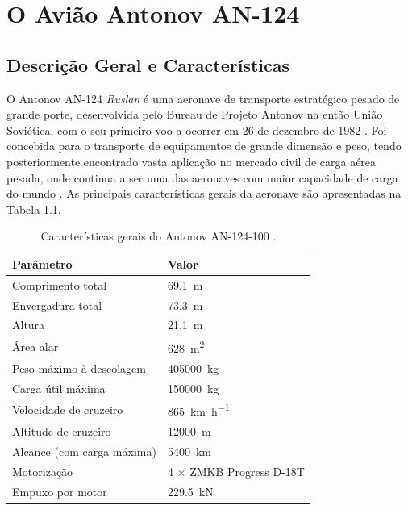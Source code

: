\documentclass[11pt,oneside,a4paper,final]{report}
\begin{document}
\chapter{O Avião Antonov AN-124}
\label{chap:an124}

\section{Descrição Geral e Características}

O Antonov AN-124 \textit{Ruslan} é uma aeronave de transporte estratégico pesado de grande porte, desenvolvida pelo Bureau de Projeto Antonov na então União Soviética, com o seu primeiro voo a ocorrer em 26 de dezembro de 1982 \cite{Gordon2008}. Foi concebida para o transporte de equipamentos de grande dimensão e peso, tendo posteriormente encontrado vasta aplicação no mercado civil de carga aérea pesada, onde continua a ser uma das aeronaves com maior capacidade de carga do mundo \cite{GarciaFernandez2025}. As principais características gerais da aeronave são apresentadas na Tabela \ref{tab:an124_specs}.

\begin{table}[H]
\centering
\caption{Características gerais do Antonov AN-124-100 
\cite{Gordon2008, GarciaFernandez2025}.}
\label{tab:an124_specs}
\renewcommand{\arraystretch}{1.4}
\begin{tabularx}{\textwidth}{p{5.5cm} X}
\toprule
\textbf{Parâmetro} & \textbf{Valor} \\
\midrule
Comprimento total           & \SI{69.1}{\meter} \\
Envergadura total           & \SI{73.3}{\meter} \\
Altura                      & \SI{21.1}{\meter} \\
Área alar                   & \SI{628}{\meter\squared} \\
Peso máximo à descolagem    & \SI{405000}{\kilo\gram} \\
Carga útil máxima           & \SI{150000}{\kilo\gram} \\
Velocidade de cruzeiro      & \SI{865}{\kilo\meter\per\hour} \\
Altitude de cruzeiro        & \SI{12000}{\meter} \\
Alcance (com carga máxima)  & \SI{5400}{\kilo\meter} \\
Motorização                 & 4 $\times$ ZMKB Progress D-18T \\
Empuxo por motor            & \SI{229.5}{\kilo\newton} \\
\bottomrule
\end{tabularx}
\end{table}
\end{document}
